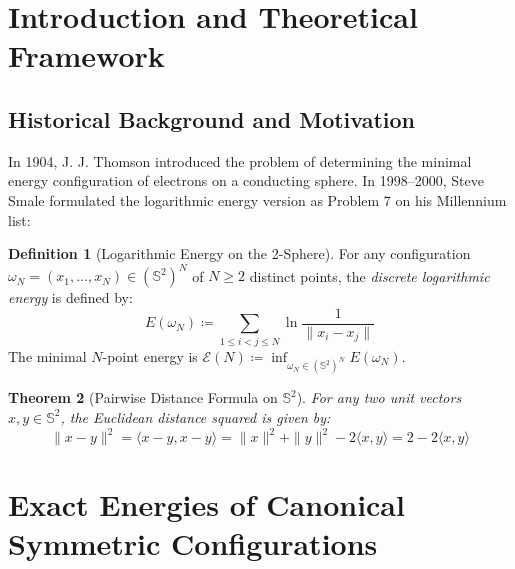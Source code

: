 \documentclass[11pt,a4paper]{article}
\newtheorem{theorem}{Theorem}[section]
\theoremstyle{definition}
\newtheorem{definition}[theorem]{Definition}
\begin{document}
\tableofcontents
\newpage

\section{Introduction and Theoretical Framework}

\subsection{Historical Background and Motivation}
In 1904, J. J. Thomson \cite{thomson1904} introduced the problem of determining the minimal energy configuration of electrons on a conducting sphere.
In 1998--2000, Steve Smale \cite{smale2000} formulated the logarithmic energy version as Problem 7 on his Millennium list:

\begin{definition}[Logarithmic Energy on the 2-Sphere]\label{def:log_energy}
For any configuration $\omega_N = (x_1, \dots, x_N) \in (\mathbb{S}^2)^N$ of $N \ge 2$ distinct points, the \emph{discrete logarithmic energy} is defined by:
\begin{equation}\label{eq:log_energy_def}
E(\omega_N) \coloneqq \sum_{1 \le i < j \le N} \ln \frac{1}{\|x_i - x_j\|}
\end{equation}
The minimal $N$-point energy is $\mathcal{E}(N) \coloneqq \inf_{\omega_N \in (\mathbb{S}^2)^N} E(\omega_N)$.
\end{definition}

\begin{theorem}[Pairwise Distance Formula on $\mathbb{S}^2$]\label{thm:dist_formula}
For any two unit vectors $x, y \in \mathbb{S}^2$, the Euclidean distance squared is given by:
\begin{equation}\label{eq:dist_sq}
\|x - y\|^2 = \langle x - y, x - y \rangle = \|x\|^2 + \|y\|^2 - 2 \langle x, y \rangle = 2 - 2 \langle x, y \rangle
\end{equation}
\end{theorem}

\section{Exact Energies of Canonical Symmetric Configurations}
\end{document}
